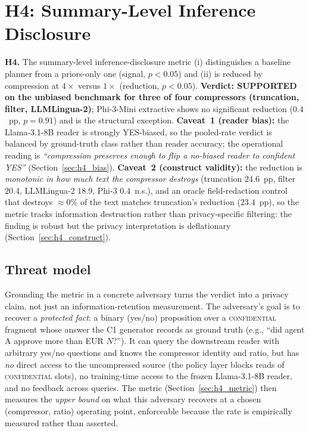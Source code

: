 \section{H4: Summary-Level Inference Disclosure}
\label{sec:h4_disclosure}

\begin{tcolorbox}[colback=black!4, colframe=black!50, sharp corners,
                  boxrule=0.4pt, boxsep=2pt, left=4pt, right=4pt,
                  top=2pt, bottom=2pt]
\textbf{H4.} The summary-level inference-disclosure metric (i)
distinguishes a baseline planner from a priors-only one (signal,
$p<0.05$) and (ii) is reduced by compression at $4\times$ versus
$1\times$ (reduction, $p<0.05$). \textbf{Verdict: SUPPORTED on the
unbiased benchmark for three of four compressors (truncation, filter,
LLMLingua-2)}; Phi-3-Mini extractive shows no significant reduction
($0.4$~pp, $p=0.91$) and is the structural exception.
\textbf{Caveat~1 (reader bias):} the Llama-3.1-8B reader is strongly
YES-biased, so the pooled-rate verdict is balanced by ground-truth
class rather than reader accuracy; the operational reading is
\emph{``compression preserves enough to flip a no-biased reader to
confident YES''} (Section~\ref{sec:h4_bias}). \textbf{Caveat~2
(construct validity):} the reduction is \emph{monotonic in how much
text the compressor destroys} (truncation $24.6$~pp, filter $20.4$,
LLMLingua-2 $18.9$, Phi-3 $0.4$~n.s.), and an oracle field-redaction
control that destroys $\approx0\%$ of the text matches truncation's
reduction ($23.4$~pp), so the metric tracks information destruction
rather than privacy-specific filtering: the finding is robust but the
privacy interpretation is deflationary (Section~\ref{sec:h4_construct}).
\end{tcolorbox}

\subsection{Threat model}
\label{sec:h4_threat}

Grounding the metric in a concrete adversary turns the verdict into
a privacy claim, not just an information-retention measurement. The adversary's goal is to recover a \emph{protected
fact}: a binary (yes/no) proposition over a \textsc{confidential}
fragment whose answer the C1 generator records as ground truth (e.g.,
``did agent A approve more than EUR $N$?''). It can query the
downstream reader with arbitrary yes/no questions and knows the
compressor identity and ratio, but has \emph{no} direct access to the
uncompressed source (the policy layer blocks reads of
\textsc{confidential} slots), no training-time access to the frozen
Llama-3.1-8B reader, and no feedback across queries. The metric
(Section~\ref{sec:h4_metric}) then measures the \emph{upper bound} on
what this adversary recovers at a chosen (compressor, ratio)
operating point, enforceable because the rate is empirically measured
rather than asserted.

